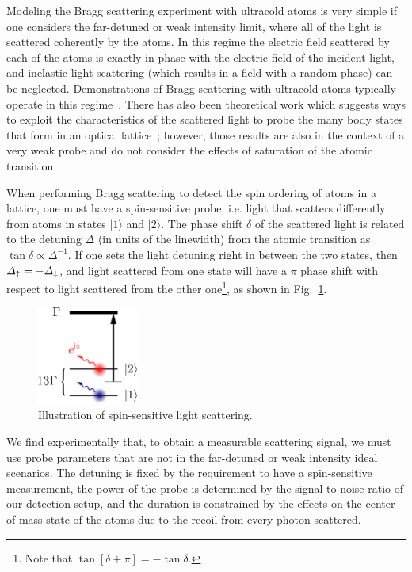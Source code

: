 Modeling the Bragg scattering experiment with ultracold atoms is very simple if
one considers the far-detuned or weak intensity limit,  where all of the light
is scattered coherently by the atoms. In this regime the electric field
scattered by each of the atoms is exactly in phase with the electric field of
the incident light, and inelastic light scattering (which results in a field
with a random phase) can be neglected.  Demonstrations of Bragg scattering with
ultracold atoms typically operate in this
regime~\cite{PhysRevLett.75.2823,PhysRevLett.75.4583,Miyake2011}.  There has
also been theoretical work which suggests ways to exploit the  characteristics
of the scattered light to probe the many body states that form in an optical
lattice~\cite{Ted2010, PhysRevX.4.031036};  however, those results are also in
the context of a very weak probe and do not consider the effects of saturation
of the atomic transition.  

When performing Bragg scattering to detect the spin ordering of atoms in a
lattice, one must have a spin-sensitive probe, i.e.  light that scatters
differently from atoms in states $|1\rangle$ and $|2\rangle$.   The phase shift
$\delta$ of the scattered light is related to the detuning $\Delta$ (in units
of the linewidth)  from the atomic transition as $\tan{\delta} \propto
\Delta^{-1}$.  If one sets the light detuning right in between the two states,
then $\Delta_{ \uparrow } = -\Delta_{ \downarrow}$, and light scattered from one state
will have a $\pi$ phase shift with respect to light scattered from the other
one\footnote{Note that $\tan[\delta+\pi]=-\tan\delta$.}, as shown in
Fig.~\ref{fig:spin-sense}.    
\begin{figure}
    \centering
\includegraphics[width=0.3\textwidth]{../figures/braggscatt/spin-sensitive12.png}
\caption{\small Illustration of spin-sensitive light scattering. }
\label{fig:spin-sense}
\end{figure} 
We find experimentally that, to obtain a measurable scattering signal, we must
use probe parameters that are not in the far-detuned or weak intensity ideal
scenarios.  The detuning is fixed by the requirement to have a spin-sensitive
measurement,  the power of the probe is determined by the signal to noise ratio
of our detection setup,  and the duration is constrained by the effects on the
center of mass state of the atoms due to the recoil from every photon
scattered. 
 

